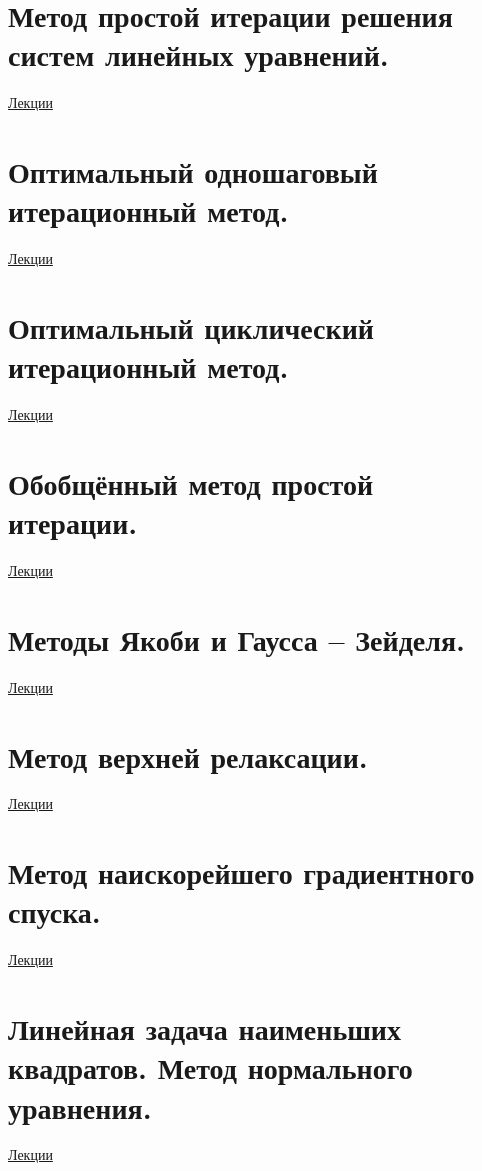 \documentclass[specialist, subf, href, colorlinks=true, 12pt, times, mtpro, final]{disser}
\theoremstyle{definition}
\begin{document}
\section {Метод простой итерации решения систем линейных уравнений.}
	\hyperlink {lects.58}{Лекции}\\

\section {Оптимальный одношаговый итерационный метод.}
	\hyperlink {lects.60}{Лекции}\\

\section {Оптимальный циклический итерационный метод.}
	\hyperlink {lects.61}{Лекции}\\

\section {Обобщённый метод простой итерации.}
	\hyperlink {lects.63}{Лекции}\\

\section {Методы Якоби и Гаусса -- Зейделя.}
	\hyperlink {lects.65}{Лекции}\\

\section {Метод верхней релаксации.}
	\hyperlink {lects.67}{Лекции}\\

\section {Метод наискорейшего градиентного спуска.}
	\hyperlink {lects.68}{Лекции}\\

\section {Линейная задача наименьших квадратов. Метод нормального уравнения.}
	\hyperlink {lects.71}{Лекции}\\
\end{document}
